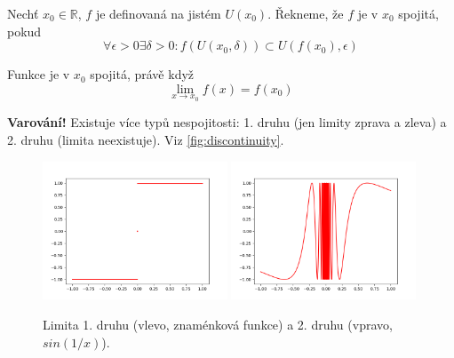 \begin{definition}[name=Spojitost, label=def:continuity]
    Nechť $x_0\in\mathbb{R}$, $f$ je definovaná na jistém $U(x_0)$. Řekneme, že $f$ je v $x_0$
    spojitá, pokud
    \begin{equation}
        \forall\epsilon>0\exists\delta>0:f\left(U(x_0,\delta)\right)\subset
            U\left(f(x_0),\epsilon\right)
    \end{equation}
\end{definition}

\begin{theorem}[name=Limita a spojitost, label=thm:limitAndContinuity]
    Funkce je v $x_0$ spojitá, právě když
    \begin{equation}
        \lim_{x\to x_0}f(x)=f(x_0)
    \end{equation}
\end{theorem}
\textbf{Varování!} Existuje více typů nespojitosti: 1. druhu (jen limity zprava
a zleva) a 2. druhu (limita neexistuje). Viz \autoref{fig:discontinuity}.
\begin{figure}[ht!]
    \begin{center}
        \includegraphics[width=0.49\textwidth,keepaspectratio]{../img/chapter2/typesOfDiscontinuity_1.png}
        \includegraphics[width=0.49\textwidth,keepaspectratio]{../img/chapter2/typesOfDiscontinuity_2.png}
        \caption{Limita 1. druhu (vlevo, znaménková funkce) a 2. druhu (vpravo, $sin(1/x)$).}
        \label{fig:discontinuity}
    \end{center}
\end{figure}\FloatBarrier
